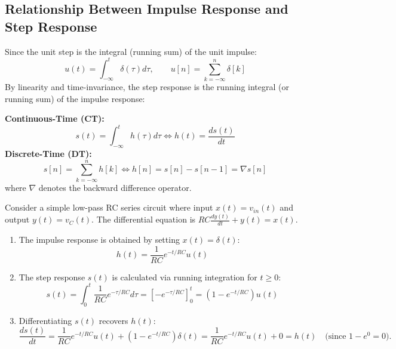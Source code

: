 \documentclass[12pt,a4paper]{article}
\begin{document}
\subsection{Relationship Between Impulse Response and Step Response}
Since the unit step is the integral (running sum) of the unit impulse:
\begin{equation}
  u(t) = \int_{-\infty}^t \delta(\tau) d\tau, \qquad u[n] = \sum_{k=-\infty}^n \delta[k]
\end{equation}
By linearity and time-invariance, the step response is the running integral (or running sum) of the impulse response:

\begin{tcolorbox}[formulabox, title={\textbf{Fundamental Inter-relationships: Impulse $\leftrightarrow$ Step Response}}]
\textbf{Continuous-Time (CT):}
\begin{equation}
  s(t) = \int_{-\infty}^{t} h(\tau) d\tau \iff h(t) = \frac{ds(t)}{dt}
\end{equation}
\textbf{Discrete-Time (DT):}
\begin{equation}
  s[n] = \sum_{k=-\infty}^{n} h[k] \iff h[n] = s[n] - s[n-1] = \nabla s[n]
\end{equation}
where $\nabla$ denotes the backward difference operator.
\end{tcolorbox}

\begin{tcolorbox}[examplebox, title={\textbf{Derivation Example: Step Response of First-Order RC Circuit}}]
Consider a simple low-pass RC series circuit where input $x(t) = v_{in}(t)$ and output $y(t) = v_C(t)$. The differential equation is $RC \frac{dy(t)}{dt} + y(t) = x(t)$.
\begin{enumerate}[topsep=2pt, itemsep=2pt]
  \item The impulse response is obtained by setting $x(t) = \delta(t)$:
  \begin{equation*}
    h(t) = \frac{1}{RC} e^{-t/RC} u(t)
  \end{equation*}
  \item The step response $s(t)$ is calculated via running integration for $t \ge 0$:
  \begin{equation*}
    s(t) = \int_0^t \frac{1}{RC} e^{-\tau/RC} d\tau = \left[ -e^{-\tau/RC} \right]_0^t = \left( 1 - e^{-t/RC} \right) u(t)
  \end{equation*}
  \item Differentiating $s(t)$ recovers $h(t)$:
  \begin{equation*}
    \frac{ds(t)}{dt} = \frac{1}{RC} e^{-t/RC} u(t) + (1 - e^{-t/RC}) \delta(t) = \frac{1}{RC} e^{-t/RC} u(t) + 0 = h(t) \quad \text{(since } 1-e^0 = 0\text{)}.
  \end{equation*}
\end{enumerate}
\end{tcolorbox}
\end{document}
